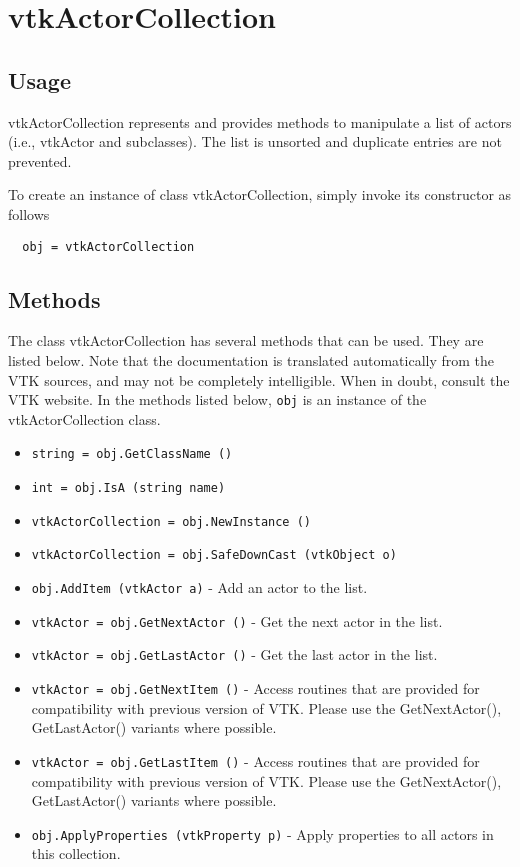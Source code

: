 \section{vtkActorCollection}

\subsection{Usage}

 vtkActorCollection represents and provides methods to manipulate a list of
 actors (i.e., vtkActor and subclasses). The list is unsorted and duplicate
 entries are not prevented.

To create an instance of class vtkActorCollection, simply
invoke its constructor as follows
\begin{verbatim}
  obj = vtkActorCollection
\end{verbatim}
\subsection{Methods}

The class vtkActorCollection has several methods that can be used.
  They are listed below.
Note that the documentation is translated automatically from the VTK sources,
and may not be completely intelligible.  When in doubt, consult the VTK website.
In the methods listed below, \verb|obj| is an instance of the vtkActorCollection class.
\begin{itemize}
\item  \verb|string = obj.GetClassName ()|

\item  \verb|int = obj.IsA (string name)|

\item  \verb|vtkActorCollection = obj.NewInstance ()|

\item  \verb|vtkActorCollection = obj.SafeDownCast (vtkObject o)|

\item  \verb|obj.AddItem (vtkActor a)| -  Add an actor to the list.

\item  \verb|vtkActor = obj.GetNextActor ()| -  Get the next actor in the list.

\item  \verb|vtkActor = obj.GetLastActor ()| -  Get the last actor in the list.

\item  \verb|vtkActor = obj.GetNextItem ()| -  Access routines that are provided for compatibility with previous
 version of VTK.  Please use the GetNextActor(), GetLastActor() variants
 where possible.

\item  \verb|vtkActor = obj.GetLastItem ()| -  Access routines that are provided for compatibility with previous
 version of VTK.  Please use the GetNextActor(), GetLastActor() variants
 where possible.

\item  \verb|obj.ApplyProperties (vtkProperty p)| -  Apply properties to all actors in this collection.

\end{itemize}
